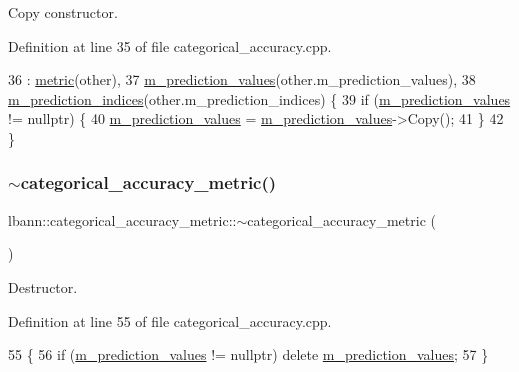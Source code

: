 Copy constructor. 

Definition at line 35 of file categorical\+\_\+accuracy.\+cpp.


\begin{DoxyCode}
36   : \hyperlink{classlbann_1_1metric_a3cd2d4f7dcbf94f70b3b8560a3171d9d}{metric}(other),
37     \hyperlink{classlbann_1_1categorical__accuracy__metric_a796e50da721050d30e0cea709484154e}{m\_prediction\_values}(other.m\_prediction\_values),
38     \hyperlink{classlbann_1_1categorical__accuracy__metric_a369a86a91f08f3ad3b12b870ccf2e427}{m\_prediction\_indices}(other.m\_prediction\_indices) \{
39   \textcolor{keywordflow}{if} (\hyperlink{classlbann_1_1categorical__accuracy__metric_a796e50da721050d30e0cea709484154e}{m\_prediction\_values} != \textcolor{keyword}{nullptr}) \{
40     \hyperlink{classlbann_1_1categorical__accuracy__metric_a796e50da721050d30e0cea709484154e}{m\_prediction\_values} = \hyperlink{classlbann_1_1categorical__accuracy__metric_a796e50da721050d30e0cea709484154e}{m\_prediction\_values}->Copy();
41   \}
42 \}
\end{DoxyCode}
\mbox{\label{classlbann_1_1categorical__accuracy__metric_ade4c5123c0f6f979308dd012f8adc615}} 
\subsubsection{\texorpdfstring{$\sim$categorical\+\_\+accuracy\+\_\+metric()}{~categorical\_accuracy\_metric()}}
{\footnotesize\ttfamily lbann\+::categorical\+\_\+accuracy\+\_\+metric\+::$\sim$categorical\+\_\+accuracy\+\_\+metric (\begin{DoxyParamCaption}{ }\end{DoxyParamCaption})\hspace{0.3cm}{\ttfamily [virtual]}}

Destructor. 

Definition at line 55 of file categorical\+\_\+accuracy.\+cpp.


\begin{DoxyCode}
55                                                           \{
56   \textcolor{keywordflow}{if} (\hyperlink{classlbann_1_1categorical__accuracy__metric_a796e50da721050d30e0cea709484154e}{m\_prediction\_values} != \textcolor{keyword}{nullptr}) \textcolor{keyword}{delete} 
      \hyperlink{classlbann_1_1categorical__accuracy__metric_a796e50da721050d30e0cea709484154e}{m\_prediction\_values};
57 \}
\end{DoxyCode}


